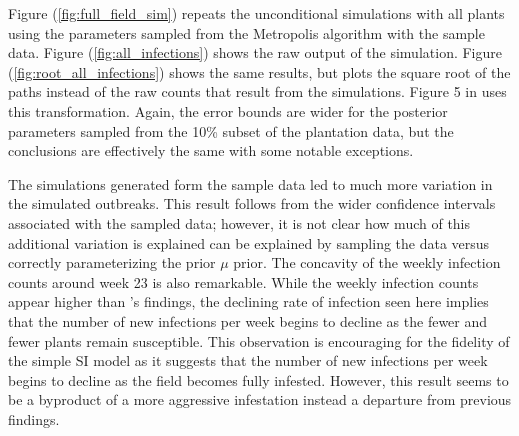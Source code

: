 \documentclass{uwstat572}
\begin{document}
Figure (\ref{fig:full_field_sim}) repeats the unconditional simulations with all plants using the parameters sampled from the Metropolis algorithm with the sample data. 
Figure (\ref{fig:all_infections}) shows the raw output of the simulation. 
Figure (\ref{fig:root_all_infections}) shows the same results, but plots the square root of the paths instead of the raw counts that result from the simulations. 
Figure 5 in \citet{Brown} uses this transformation. 
Again, the error bounds are wider for the posterior parameters sampled from the 10\% subset of the plantation data, but the conclusions are effectively the same with some notable exceptions. 

The simulations generated form the sample data led to much more variation in the simulated outbreaks. 
This result follows from the wider confidence intervals associated with the sampled data; however, it is not clear how much of this additional variation is explained can be explained by sampling the data versus correctly parameterizing the prior $\mu$ prior. 
The concavity of the weekly infection counts around week 23 is also remarkable. 
While the weekly infection counts appear higher than \citet{Brown}'s findings, the declining rate of infection seen here implies that the number of new infections per week begins to decline as the fewer and fewer plants remain susceptible. 
This observation is encouraging for the fidelity of the simple SI model as it suggests that the number of new infections per week begins to decline as the field becomes fully infested. 
However, this result seems to be a byproduct of a more aggressive infestation instead a departure from previous findings. 
\end{document}
